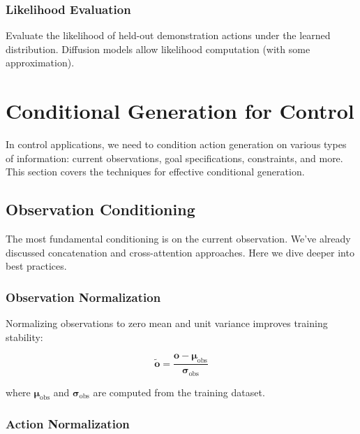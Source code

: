 \subsubsection{Likelihood Evaluation}

Evaluate the likelihood of held-out demonstration actions under the learned distribution. Diffusion models allow likelihood computation (with some approximation).

\section{Conditional Generation for Control}
\label{sec:conditional_generation_control}

In control applications, we need to condition action generation on various types of information: current observations, goal specifications, constraints, and more. This section covers the techniques for effective conditional generation.

\subsection{Observation Conditioning}
\label{subsec:observation_conditioning}

The most fundamental conditioning is on the current observation. We've already discussed concatenation and cross-attention approaches. Here we dive deeper into best practices.

\subsubsection{Observation Normalization}

Normalizing observations to zero mean and unit variance improves training stability:

\begin{equation}
\tilde{\mathbf{o}} = \frac{\mathbf{o} - \boldsymbol{\mu}_{\text{obs}}}{\boldsymbol{\sigma}_{\text{obs}}}
\label{eq:obs_normalization}
\end{equation}

where $\boldsymbol{\mu}_{\text{obs}}$ and $\boldsymbol{\sigma}_{\text{obs}}$ are computed from the training dataset.

\subsubsection{Action Normalization}

